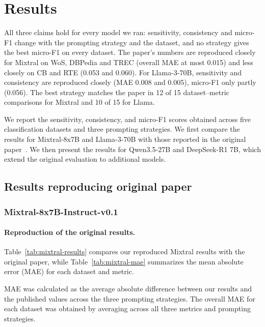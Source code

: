 \section{Results}
\label{sec:results}

All three claims hold for every model we ran: sensitivity, consistency and
micro-F1 change with the prompting strategy and the dataset, and no strategy
gives the best micro-F1 on every dataset. The paper's numbers are reproduced
closely for Mixtral on WoS, DBPedia and TREC (overall MAE at most 0.015) and
less closely on CB and RTE (0.053 and 0.060). For Llama-3-70B, sensitivity and
consistency are reproduced closely (MAE 0.008 and 0.005), micro-F1 only
partly (0.056). The best strategy matches the paper in 12 of 15
dataset--metric comparisons for Mixtral and 10 of 15 for Llama.

\par\medskip

We report the sensitivity, consistency, and
micro-F1 scores obtained across five classification
datasets and three prompting strategies.
We first compare the results for Mixtral-8x7B
and Llama-3-70B with those reported in the
original paper~\cite{Errica:2025}.
We then present the results for Qwen3.5-27B
and DeepSeek-R1 7B, which extend the original
evaluation to additional models.


\subsection{Results reproducing original paper}

\subsubsection{Mixtral-8x7B-Instruct-v0.1}

\paragraph{Reproduction of the original results.}
\mbox{}\par

Table~\ref{tab:mixtral-results} compares our
reproduced Mixtral results with the original
paper, while Table~\ref{tab:mixtral-mae}
summarizes the mean absolute error (MAE)
for each dataset and metric.

\par\medskip

MAE was calculated as the average absolute
difference between our results and the published
values across the three prompting strategies.
The overall MAE for each dataset was obtained
by averaging across all three metrics and
prompting strategies.

